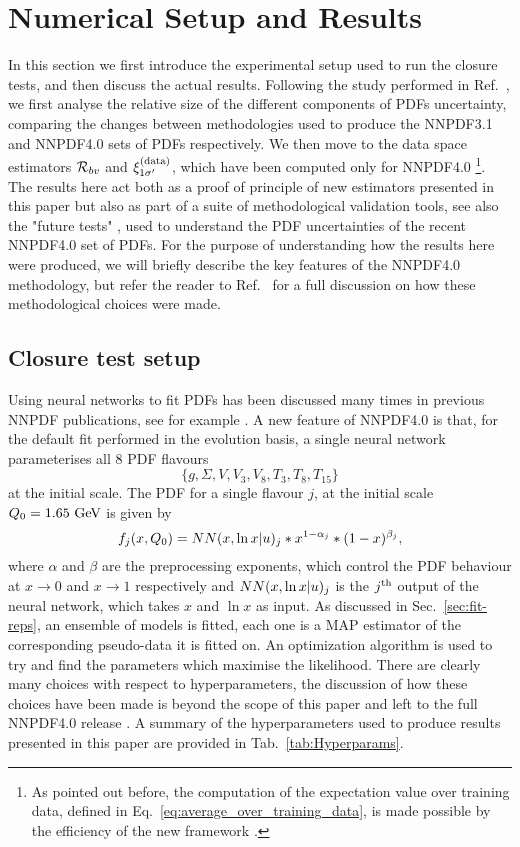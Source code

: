 \section{Numerical Setup and Results}
\label{sec:numerical-results}

In this section we first introduce the experimental setup used to run the
closure tests, and then discuss the actual results. Following the study
performed in Ref.~\cite{nnpdf30}, we first analyse the relative size of the
different components of PDFs uncertainty, comparing the changes between methodologies
used to produce the NNPDF3.1 \cite{Ball_2017} and
NNPDF4.0 \cite{NNPDF40} sets of PDFs respectively. We then move to the data
space estimators $\mathcal{R}_{bv}$ and $\xi^{(\rm data)}_{1 {{\sigma}^{\prime}}}$, which have been computed
only for NNPDF4.0 \footnote{As pointed out before, the computation of the
expectation value over training data, defined in
Eq.~\ref{eq:average_over_training_data}, is made possible by the efficiency of
the new framework \cite{nnpdf40code}.}. The results here act both as a proof of
principle of new estimators presented in this paper but also as part of a suite
of methodological validation tools, see also the "future tests"
\cite{Cruz_Martinez_2021}, used to understand the PDF uncertainties of the
recent NNPDF4.0 set of PDFs. For the purpose of understanding how the results
here were produced, we will briefly describe the key features of the NNPDF4.0
methodology, but refer the reader to Ref.~\cite{NNPDF40} for a full discussion on how these
methodological choices were made.

\subsection{Closure test setup}

Using neural networks to fit PDFs has been discussed many times in previous
NNPDF publications, see for example \cite{nnpdf30,Ball_2017}. A new feature of
NNPDF4.0 is that, for the default fit performed in the evolution basis, a single
neural network parameterises all 8 PDF flavours 
$$\{ g, \Sigma, V, V_3, V_8, T_3, T_8, T_{15} \}$$ 
at the initial scale. The PDF for a single flavour $j$, at the
initial scale $Q_0 = 1.65~{\rm GeV}$ is given by
\begin{equation}
    f_j(x, Q_0) = NN(x, \ln x | u)_j * x^{1-\alpha_j} * (1-x)^{\beta_j},
\end{equation}
where $\alpha$ and $\beta$ are the preprocessing exponents, which control the
PDF behaviour at $x \to 0$ and $x \to 1$ respectively and $NN(x, \ln x |
u)_j$ is the $j^{\rm th}$ output of the neural network, which takes $x$
and $\ln x$ as input. As discussed in Sec.~\ref{sec:fit-reps}, an ensemble of
models is fitted, each one is a MAP estimator of the corresponding pseudo-data
it is fitted on. An optimization algorithm is used to try and find the
parameters which maximise the likelihood. 
There are clearly many choices with respect to
hyperparameters, the discussion of how these choices have been made is beyond
the scope of this paper and left to the full NNPDF4.0 release \cite{NNPDF40}. A
summary of the hyperparameters used to produce results presented in this paper
are provided in Tab.~\ref{tab:Hyperparams}.

